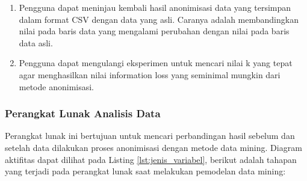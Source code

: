 \begin{enumerate}
\item Pengguna dapat meninjau kembali hasil anonimisasi data yang tersimpan dalam format CSV dengan data yang asli. Caranya adalah membandingkan nilai pada baris data yang mengalami perubahan dengan nilai pada baris data asli.

\item Pengguna dapat mengulangi eksperimen untuk mencari nilai k yang tepat agar menghasilkan nilai information loss yang seminimal mungkin dari metode anonimisasi.


 
\end{enumerate}

\subsubsection{Perangkat Lunak Analisis Data}
Perangkat lunak ini bertujuan untuk mencari perbandingan hasil sebelum dan setelah data dilakukan proses anonimisasi dengan metode data mining. Diagram aktifitas dapat dilihat pada Listing \ref{lst:jenis_variabel}, berikut adalah tahapan yang terjadi pada perangkat lunak saat melakukan pemodelan data mining:

